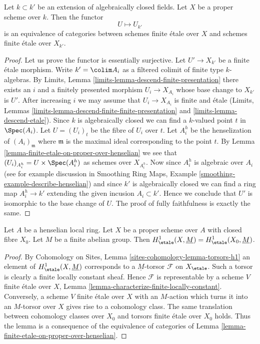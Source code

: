 \begin{lemma}
\label{lemma-finite-etale-invariant-over-proper}
Let $k \subset k'$ be an extension of algebraically closed fields.
Let $X$ be a proper scheme over $k$. Then the functor
$$
U \longmapsto U_{k'}
$$
is an equivalence of categories between schemes finite \'etale over
$X$ and schemes finite \'etale over $X_{k'}$.
\end{lemma}

\begin{proof}
Let us prove the functor is essentially surjective.
Let $U' \to X_{k'}$ be a finite \'etale morphism.
Write $k' = \colim A_i$ as a filtered colimit of finite type $k$-algebras.
By Limits, Lemma \ref{limits-lemma-descend-finite-presentation}
there exists an $i$ and a finitely presented morphism $U_i \to X_{A_i}$
whose base change to $X_{k'}$ is $U'$. After increasing $i$
we may assume that $U_i \to X_{A_i}$ is finite and \'etale
(Limits, Lemmas \ref{limits-lemma-descend-finite-finite-presentation} and
\ref{limits-lemma-descend-etale}).
Since $k$ is algebraically closed we can find a
$k$-valued point $t$ in $\Spec(A_i)$. Let $U = (U_i)_t$ be the
fibre of $U_i$ over $t$. Let $A_i^h$ be the
henselization of $(A_i)_{\mathfrak m}$ where $\mathfrak m$ is
the maximal ideal corresponding to the point $t$. By
Lemma \ref{lemma-finite-etale-on-proper-over-henselian}
we see that $(U_i)_{A_i^h} = U \times \Spec(A_i^h)$ as schemes
over $X_{A_i^h}$. Now since
$A_i^h$ is algebraic over $A_i$ (see for example discussion in
Smoothing Ring Maps, Example \ref{smoothing-example-describe-henselian})
and since $k'$ is algebraically closed
we can find a ring map $A_i^h \to k'$ extending the given
incusion $A_i \subset k'$. Hence we conclude that $U'$
is isomorphic to the base change of $U$.
The proof of fully faithfulness is exactly the same.
\end{proof}

\begin{lemma}
\label{lemma-proper-over-henselian-and-h1}
Let $A$ be a henselian local ring. Let $X$ be a proper scheme over $A$
with closed fibre $X_0$. Let $M$ be a finite abelian group.
Then $H^1_\etale(X, \underline{M}) = H^1_\etale(X_0, \underline{M})$.
\end{lemma}

\begin{proof}
By Cohomology on Sites, Lemma \ref{sites-cohomology-lemma-torsors-h1}
an element of $H^1_\etale(X, \underline{M})$ corresponds to a
$\underline{M}$-torsor $\mathcal{F}$ on $X_\etale$.
Such a torsor is clearly a finite locally constant sheaf.
Hence $\mathcal{F}$ is representable by a scheme $V$ finite
\'etale over $X$, Lemma \ref{lemma-characterize-finite-locally-constant}.
Conversely, a scheme $V$ finite \'etale over $X$ with an $M$-action
which turns it into an $M$-torsor over $X$ gives rise to a cohomology
class. The same translation between cohomology classes over $X_0$ and
torsors finite \'etale over $X_0$ holds. Thus the lemma
is a consequence of the equivalence of categories of
Lemma \ref{lemma-finite-etale-on-proper-over-henselian}.
\end{proof}

